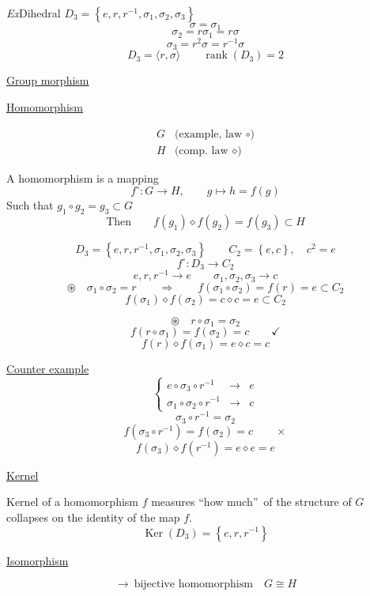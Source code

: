 \documentclass[a4paper,11pt]{article}
\newcommand{\sig}[1]{\sigma_{#1}}
\begin{document}
\textit{Ex}\quad Dihedral $D_3=\left\{e,r,r^{-1},\sig{1},\sig{2},\sig{3}\right\}$
\[
\sigma=\sig{1}
\]
\[
\sig{2}=r\sig{1}=r\sigma
\]
\[
\sig{3}=r^2\sigma=r^{-1}\sigma
\]
\[
D_3=\langle r,\sigma\rangle
\qquad \operatorname{rank}(D_3)=2
\]

\begin{center}
{\Large \underline{Group morphism}}
\end{center}

\underline{Homomorphism}

\[
\begin{array}{ll}
G&\text{(example, law }\circ\text{)}\\
H&\text{(comp. law }\diamond\text{)}
\end{array}
\]

A homomorphism is a mapping
\[
f^\circ:G\longrightarrow H,\qquad g\longmapsto h=f(g)
\]
Such that $g_1\circ g_2=g_3\subset G$
\[
\text{Then}\qquad f(g_1)\diamond f(g_2)=f(g_3)\subset H
\]

\[
D_3=\left\{e,r,r^{-1},\sig{1},\sig{2},\sig{3}\right\}
\qquad
C_2=\left\{e,c\right\},\quad c^2=e
\]
\[
f^\circ:D_3\longrightarrow C_2
\]
\[
e,r,r^{-1}\longrightarrow e
\qquad
\sig{1},\sig{2},\sig{3}\longrightarrow c
\]
\[
\circledast\quad \sig{1}\circ\sig{2}=r
\qquad\Longrightarrow\qquad
f(\sig{1}\circ\sig{2})=f(r)=e\subset C_2
\]
\[
f(\sig{1})\diamond f(\sig{2})=c\diamond c=e\subset C_2
\]

\[
\circledast\quad r\circ\sig{1}=\sig{2}
\]
\[
f(r\circ\sig{1})=f(\sig{2})=c\qquad\checkmark
\]
\[
f(r)\diamond f(\sig{1})=e\diamond c=c
\]

\underline{Counter example}
\[
\left\{
\begin{array}{rcl}
e\circ\sig{3}\circ r^{-1}&\longrightarrow&e\\
\sig{1}\circ\sig{2}\circ r^{-1}&\longrightarrow&c
\end{array}
\right.
\]
\[
\sig{3}\circ r^{-1}=\sig{2}
\]
\[
f(\sig{3}\circ r^{-1})=f(\sig{2})=c
\qquad\times
\]
\[
f(\sig{3})\diamond f(r^{-1})=e\diamond e=e
\]

\underline{Kernel}

Kernel of a homomorphism $f$ measures \textquotedblleft how much\textquotedblright\ of the
structure of $G$ collapses on the identity of the map $f$.
\[
\operatorname{Ker}(D_3)=\left\{e,r,r^{-1}\right\}
\]

\underline{Isomorphism}

\[
\longrightarrow\ \text{bijective homomorphism}\quad
G\cong H
\]
\end{document}
